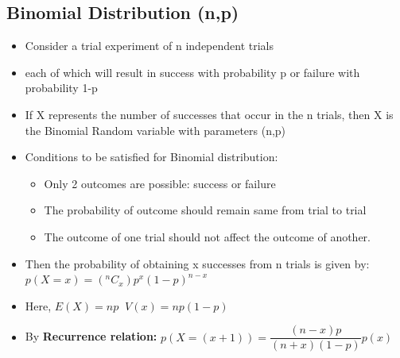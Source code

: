 \documentclass[8pt]{report}
\begin{document}
		\subsection{Binomial Distribution (n,p)}
			\begin{itemize}
				\item Consider a trial experiment of n independent trials
				\item each of which will result in success with probability p or failure with probability 1-p
				\item If X represents the number of successes that occur in the n trials, then X is the Binomial Random variable with parameters (n,p)
				\item Conditions to be satisfied for Binomial distribution:
					\begin{itemize}
						\item Only 2 outcomes are possible: success or failure
						\item The probability of outcome should remain same from trial to trial
						\item The outcome of one trial should not affect the outcome of another. 
					\end{itemize}
				\item Then the probability of obtaining x successes from n trials is given by:
$\boxed{p(X=x)= (^nC_x)p^x(1-p)^{n-x}}$
				\item Here, $\boxed{E(X)=np}\;\;\boxed{V(x)=np(1-p)}$
				\item By \textbf{Recurrence relation:} $\boxed{p(X=(x+1)) = \dfrac{(n-x)p}{(n+x)(1-p)}p(x)}$
			\end{itemize}\hrulefill
\end{document}
